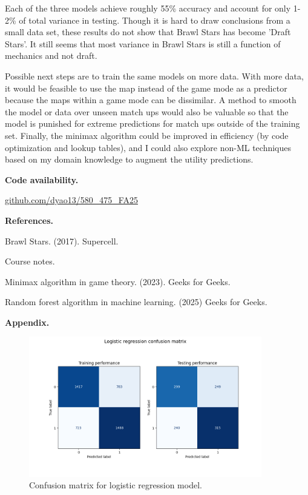 \documentclass[11pt]{article}
\begin{document}
Each of the three models achieve roughly 55\% accuracy and account for only 1-2\% of total variance in testing. Though it is hard to draw conclusions from a small data set, these results do not show that Brawl Stars has become 'Draft Stars'. It still seems that most variance in Brawl Stars is still a function of mechanics and not draft.

Possible next steps are to train the same models on more data. With more data, it would be feasible to use the map instead of the game mode as a predictor because the maps within a game mode can be dissimilar. A method to smooth the model or data over unseen match ups would also be valuable so that the model is punished for extreme predictions for match ups outside of the training set. Finally, the minimax algorithm could be improved in efficiency (by code optimization and lookup tables), and I could also explore non-ML techniques based on my domain knowledge to augment the utility predictions.

\textbf{Code availability.}

\href{https://github.com/dyao13/580_475_FA25}{github.com/dyao13/580\_475\_FA25}

\textbf{References.}

Brawl Stars. (2017). Supercell.

Course notes.

Minimax algorithm in game theory. (2023). Geeks for Geeks.

Random forest algorithm in machine learning. (2025) Geeks for Geeks.

\newpage \textbf{Appendix.}

\begin{figure}[h!]
\centering
\begin{center} \includegraphics[width=4in]{"../output/lr_confusion_matrix.png"} \end{center}
\caption{Confusion matrix for logistic regression model.}
\label{fig:lr-cm}
\end{figure}
\end{document}
